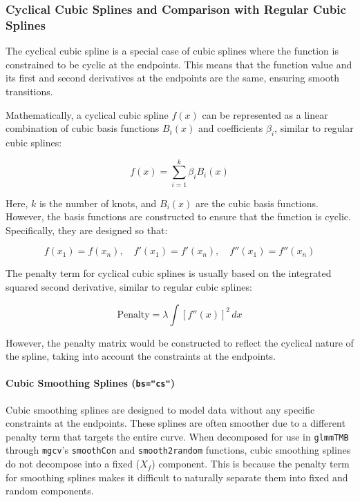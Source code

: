 \subsubsection{Cyclical Cubic Splines and Comparison with Regular Cubic Splines}


The cyclical cubic spline is a special case of cubic splines where the function is constrained to be cyclic at the endpoints. This means that the function value and its first and second derivatives at the endpoints are the same, ensuring smooth transitions.



Mathematically, a cyclical cubic spline \( f(x) \) can be represented as a linear combination of cubic basis functions \( B_i(x) \) and coefficients \( \beta_i \), similar to regular cubic splines:

\[
f(x) = \sum_{i=1}^{k} \beta_i B_i(x)
\]

Here, \( k \) is the number of knots, and \( B_i(x) \) are the cubic basis functions. However, the basis functions are constructed to ensure that the function is cyclic. Specifically, they are designed so that:

\[
f(x_1) = f(x_n), \quad f'(x_1) = f'(x_n), \quad f''(x_1) = f''(x_n)
\]



The penalty term for cyclical cubic splines is usually based on the integrated squared second derivative, similar to regular cubic splines:

\[
\text{Penalty} = \lambda \int [f''(x)]^2 \, dx
\]

However, the penalty matrix would be constructed to reflect the cyclical nature of the spline, taking into account the constraints at the endpoints.


\paragraph{Cubic Smoothing Splines (\texttt{bs="cs"})}

Cubic smoothing splines are designed to model data without any specific constraints at the endpoints. These splines are often smoother due to a different penalty term that targets the entire curve. When decomposed for use in \texttt{glmmTMB} through \texttt{mgcv}'s \texttt{smoothCon} and \texttt{smooth2random} functions, cubic smoothing splines do not decompose into a fixed (\(X_f\)) component. This is because the penalty term for smoothing splines makes it difficult to naturally separate them into fixed and random components.

